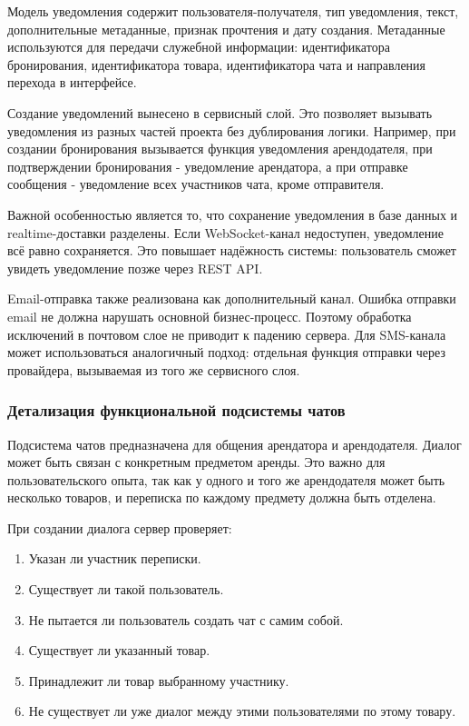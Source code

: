 Модель уведомления содержит пользователя-получателя, тип уведомления, текст, дополнительные метаданные, признак прочтения и дату создания. Метаданные используются для передачи служебной информации: идентификатора бронирования, идентификатора товара, идентификатора чата и направления перехода в интерфейсе.

Создание уведомлений вынесено в сервисный слой. Это позволяет вызывать уведомления из разных частей проекта без дублирования логики. Например, при создании бронирования вызывается функция уведомления арендодателя, при подтверждении бронирования - уведомление арендатора, а при отправке сообщения - уведомление всех участников чата, кроме отправителя.

Важной особенностью является то, что сохранение уведомления в базе данных и realtime-доставки разделены. Если WebSocket-канал недоступен, уведомление всё равно сохраняется. Это повышает надёжность системы: пользователь сможет увидеть уведомление позже через REST API.

Email-отправка также реализована как дополнительный канал. Ошибка отправки email не должна нарушать основной бизнес-процесс. Поэтому обработка исключений в почтовом слое не приводит к падению сервера. Для SMS-канала может использоваться аналогичный подход: отдельная функция отправки через провайдера, вызываемая из того же сервисного слоя.

\subsubsection{Детализация функциональной подсистемы чатов}
Подсистема чатов предназначена для общения арендатора и арендодателя. Диалог может быть связан с конкретным предметом аренды. Это важно для пользовательского опыта, так как у одного и того же арендодателя может быть несколько товаров, и переписка по каждому предмету должна быть отделена.

При создании диалога сервер проверяет:
\begin{enumerate}
    \item Указан ли участник переписки.
    \item Существует ли такой пользователь.
    \item Не пытается ли пользователь создать чат с самим собой.
    \item Существует ли указанный товар.
    \item Принадлежит ли товар выбранному участнику.
    \item Не существует ли уже диалог между этими пользователями по этому товару.
\end{enumerate}

